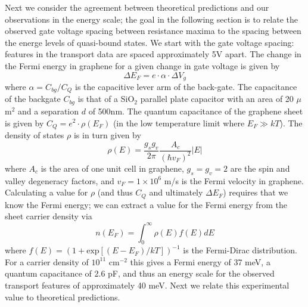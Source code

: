 \documentclass[edeposit,fullpage,draftthesis]{uiucthesis2009}
\begin{document}
            Next we consider the agreement between theoretical predictions and our observations in
            the energy scale; the goal in the following section is to relate the observed gate voltage
            spacing between resistance maxima to the spacing between the energe levels of
            quasi-bound states.
            We start with the gate voltage spacing: features in the transport data are spaced approximately 5V apart.
            The change in the Fermi energy in graphene for a given change in gate voltage is given by
            \begin{equation}
                \Delta E_F = e \cdot \alpha \cdot \Delta V_g
            \end{equation}
            where $\alpha = C_{bg} / C_Q$ is the capacitive lever arm of the back-gate. The capacitance of the backgate $C_{bg}$
            is that of a SiO$_2$ parallel plate capacitor with an area of 20 $\mu$m$^2$ and a separation $d$ of 500nm.
            The quantum capacitance of the graphene sheet is given by $C_Q = e^2 \cdot \rho(E_F)$ \cite{fang2007carrier}
            (in the low temperature limit where $E_F \gg kT$). The density of states $\rho$ is in turn given by \cite{CastroNeto2009}
            \begin{equation}
                \rho(E) = \frac{g_s g_v}{2 \pi} \frac{A_c}{(\hbar v_F)^2} |E|   
            \end{equation}
            where $A_c$ is the area of one unit cell in graphene, $g_s = g_v = 2$ are the spin and valley degeneracy
            factors, and $v_F = 1 \times 10^6 $ m/s is the Fermi velocity in graphene.
            Calculating a value for $\rho$ (and thus $C_Q$ and ultimately $\Delta E_F$) 
            requires that we know the Fermi energy; we can extract
            a value for the Fermi energy from the sheet carrier density via
            \begin{equation}
                n(E_F) = \int_{0}^{\infty} \rho(E) f(E) dE
            \end{equation}
            where $f(E) = (1 + \text{exp}[(E - E_F) / kT])^{-1}$ is the Fermi-Dirac distribution. For a carrier density
            of $10^{11}$ cm$^{-2}$ this gives a Fermi energy of 37 meV, a quantum capacitance of 2.6 pF,
            and thus an energy scale for the observed transport features of approximately 40 meV.
            Next we relate this experimental value to theoretical predictions.
            
\end{document}
